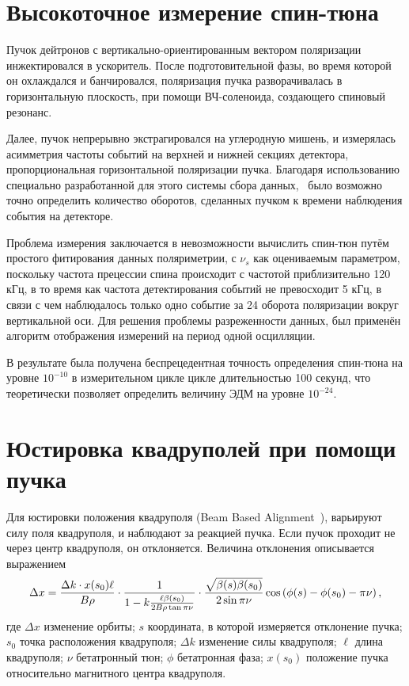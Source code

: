 

\section{Высокоточное измерение спин-тюна}
Пучок дейтронов с вертикально-ориентированным вектором поляризации инжектировался в ускоритель. После подготовительной фазы, во время которой он охлаждался и банчировался, поляризация пучка разворачивалась в горизонтальную плоскость, при помощи ВЧ-соленоида, создающего спиновый резонанс. 

Далее, пучок непрерывно экстрагировался на углеродную мишень, и измерялась асимметрия частоты событий на верхней и нижней секциях детектора, пропорциональная горизонтальной поляризации пучка. Благодаря использованию специально разработанной для этого системы сбора данных,~\cite{COSY:DAQ} было возможно точно определить количество оборотов, сделанных пучком к времени наблюдения события на детекторе.

Проблема измерения заключается в невозможности вычислить спин-тюн путём простого фитирования данных поляриметрии, с $\nu_s$ как оцениваемым параметром, поскольку частота прецессии спина происходит с частотой приблизительно 120 кГц, в то время как частота детектирования событий не превосходит 5 кГц, в связи с чем наблюдалось только одно событие за 24 оборота поляризации вокруг вертикальной оси. Для решения проблемы разреженности данных, был применён алгоритм отображения измерений на период одной осцилляции.~\cite{Eversmann:SpinTuneMeasurement}

В результате была получена беспрецедентная точность определения спин-тюна на уровне $10^{-10}$ в измерительном цикле цикле длительностью 100 секунд, что теоретически позволяет определить величину ЭДМ на уровне $10^{-24}$\ecm.

\section{Юстировка квадруполей при помощи пучка}
\newcommand{\Nbpm}{N_{\mathrm{BPM}}}
Для юстировки положения квадруполя (Beam Based Alignment~\cite{Wagner:BBA2018}), варьируют силу поля квадруполя, и наблюдают за реакцией пучка. Если пучок проходит не через центр квадруполя, он отклоняется. Величина отклонения описывается выражением
\[
\Delta x = \frac{\Delta k\cdot x(s_0)\ell}{B\rho}\cdot \frac{1}{1 - k\frac{\ell\beta(s_0)}{2B\rho\tan\pi\nu}}\cdot \frac{\sqrt{\beta(s)\beta(s_0)}}{2\sin\pi\nu}\cos\bkt{\phi(s) - \phi(s_0) - \pi\nu},
\]
где $\Delta x$ изменение орбиты; $s$ координата, в которой измеряется отклонение пучка; $s_0$ точка расположения квадруполя; $\Delta k$ изменение силы квадруполя; $\ell$ длина квадруполя; $\nu$ бетатронный тюн; $\phi$ бетатронная фаза; $x(s_0)$ положение пучка относительно магнитного центра квадруполя.

